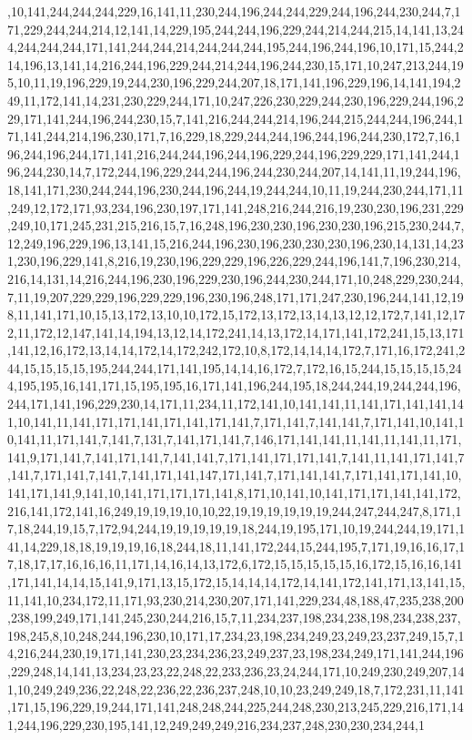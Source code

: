 ,10,141,244,244,244,229,16,141,11,230,244,196,244,244,229,244,196,244,230,244,7,171,229,244,244,214,12,141,14,229,195,244,244,196,229,244,214,244,215,14,141,13,244,244,244,244,171,141,244,244,214,244,244,244,195,244,196,244,196,10,171,15,244,214,196,13,141,14,216,244,196,229,244,214,244,196,244,230,15,171,10,247,213,244,195,10,11,19,196,229,19,244,230,196,229,244,207,18,171,141,196,229,196,14,141,194,249,11,172,141,14,231,230,229,244,171,10,247,226,230,229,244,230,196,229,244,196,229,171,141,244,196,244,230,15,7,141,216,244,244,214,196,244,215,244,244,196,244,171,141,244,214,196,230,171,7,16,229,18,229,244,244,196,244,196,244,230,172,7,16,196,244,196,244,171,141,216,244,244,196,244,196,229,244,196,229,229,171,141,244,196,244,230,14,7,172,244,196,229,244,244,196,244,230,244,207,14,141,11,19,244,196,18,141,171,230,244,244,196,230,244,196,244,19,244,244,10,11,19,244,230,244,171,11,249,12,172,171,93,234,196,230,197,171,141,248,216,244,216,19,230,230,196,231,229,249,10,171,245,231,215,216,15,7,16,248,196,230,230,196,230,230,196,215,230,244,7,12,249,196,229,196,13,141,15,216,244,196,230,196,230,230,230,196,230,14,131,14,231,230,196,229,141,8,216,19,230,196,229,229,196,226,229,244,196,141,7,196,230,214,216,14,131,14,216,244,196,230,196,229,230,196,244,230,244,171,10,248,229,230,244,7,11,19,207,229,229,196,229,229,196,230,196,248,171,171,247,230,196,244,141,12,198,11,141,171,10,15,13,172,13,10,10,172,15,172,13,172,13,14,13,12,12,172,7,141,12,172,11,172,12,147,141,14,194,13,12,14,172,241,14,13,172,14,171,141,172,241,15,13,171,141,12,16,172,13,14,14,172,14,172,242,172,10,8,172,14,14,14,172,7,171,16,172,241,244,15,15,15,15,195,244,244,171,141,195,14,14,16,172,7,172,16,15,244,15,15,15,15,244,195,195,16,141,171,15,195,195,16,171,141,196,244,195,18,244,244,19,244,244,196,244,171,141,196,229,230,14,171,11,234,11,172,141,10,141,141,11,141,171,141,141,141,10,141,11,141,171,171,141,171,141,171,141,7,171,141,7,141,141,7,171,141,10,141,10,141,11,171,141,7,141,7,131,7,141,171,141,7,146,171,141,141,11,141,11,141,11,171,141,9,171,141,7,141,171,141,7,141,141,7,171,141,171,171,141,7,141,11,141,171,141,7,141,7,171,141,7,141,7,141,171,141,147,171,141,7,171,141,141,7,171,141,171,141,10,141,171,141,9,141,10,141,171,171,171,141,8,171,10,141,10,141,171,171,141,141,172,216,141,172,141,16,249,19,19,19,10,10,22,19,19,19,19,19,19,244,247,244,247,8,171,17,18,244,19,15,7,172,94,244,19,19,19,19,19,18,244,19,195,171,10,19,244,244,19,171,141,14,229,18,18,19,19,19,16,18,244,18,11,141,172,244,15,244,195,7,171,19,16,16,17,17,18,17,17,16,16,16,11,171,14,16,14,13,172,6,172,15,15,15,15,15,16,172,15,16,16,141,171,141,14,14,15,141,9,171,13,15,172,15,14,14,14,172,14,141,172,141,171,13,141,15,11,141,10,234,172,11,171,93,230,214,230,207,171,141,229,234,48,188,47,235,238,200,238,199,249,171,141,245,230,244,216,15,7,11,234,237,198,234,238,198,234,238,237,198,245,8,10,248,244,196,230,10,171,17,234,23,198,234,249,23,249,23,237,249,15,7,14,216,244,230,19,171,141,230,23,234,236,23,249,237,23,198,234,249,171,141,244,196,229,248,14,141,13,234,23,23,22,248,22,233,236,23,24,244,171,10,249,230,249,207,141,10,249,249,236,22,248,22,236,22,236,237,248,10,10,23,249,249,18,7,172,231,11,141,171,15,196,229,19,244,171,141,248,248,244,225,244,248,230,213,245,229,216,171,141,244,196,229,230,195,141,12,249,249,249,216,234,237,248,230,230,234,244,1
